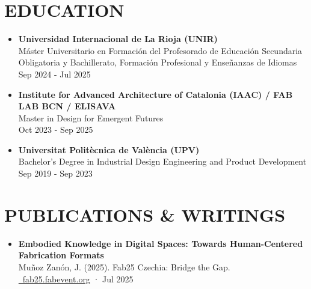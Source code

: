 \documentclass[11pt,a4paper]{article}
\begin{document}
\section*{EDUCATION}
\begin{itemize}[leftmargin=*,label={},itemsep=6pt]

    \item \textbf{Universidad Internacional de La Rioja (UNIR)}\\
    Máster Universitario en Formación del Profesorado de Educación Secundaria Obligatoria y Bachillerato, Formación Profesional y Enseñanzas de Idiomas\\
    Sep 2024 - Jul 2025 
    
    \item \textbf{Institute for Advanced Architecture of Catalonia (IAAC) / FAB LAB BCN / ELISAVA}\\
    Master in Design for Emergent Futures\\
    Oct 2023 - Sep 2025 
    
    \item \textbf{Universitat Politècnica de València (UPV)}\\
    Bachelor's Degree in Industrial Design Engineering and Product Development\\
    Sep 2019 - Sep 2023 
\end{itemize}

\section*{PUBLICATIONS \& WRITINGS}
\begin{itemize}[leftmargin=*,label={},itemsep=6pt]
    \item \textbf{Embodied Knowledge in Digital Spaces: Towards Human-Centered Fabrication Formats}\\
    Muñoz Zanón, J. (2025). Fab25 Czechia: Bridge the Gap.\\
    \href{https://zenodo.org/records/15819470}{\faLink\ fab25.fabevent.org} · Jul 2025

\end{itemize}

\end{document}
